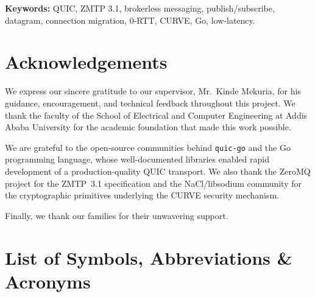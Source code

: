 \documentclass[12pt, a4paper, oneside]{report}
\begin{document}
\vspace{0.8em}
\noindent\textbf{Keywords:} QUIC, ZMTP 3.1, brokerless messaging, publish/subscribe, datagram, connection migration, 0-RTT, CURVE, Go, low-latency.

\chapter*{Acknowledgements}

We express our sincere gratitude to our supervisor, Mr.\ Kinde Mekuria, for his guidance, encouragement, and technical feedback throughout this project. We thank the faculty of the School of Electrical and Computer Engineering at Addis Ababa University for the academic foundation that made this work possible.

We are grateful to the open-source communities behind \texttt{quic-go} and the Go programming language, whose well-documented libraries enabled rapid development of a production-quality QUIC transport. We also thank the ZeroMQ project for the ZMTP~3.1 specification and the NaCl/libsodium community for the cryptographic primitives underlying the CURVE security mechanism.

Finally, we thank our families for their unwavering support.

\tableofcontents
\listoffigures
\listoftables

\chapter*{List of Symbols, Abbreviations \& Acronyms}
\end{document}
